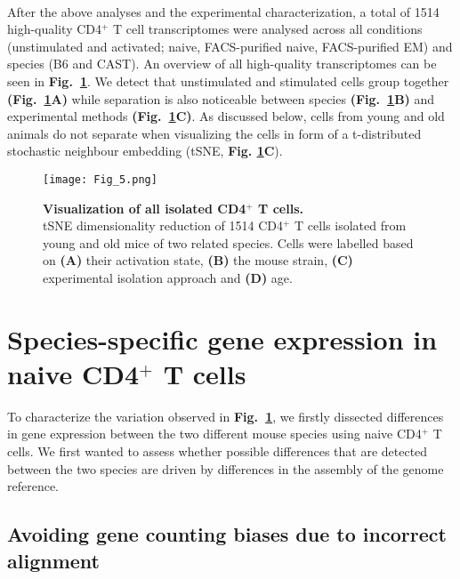 {\\}
\captionsetup[figure]{list=yes}

After the above analyses and the experimental characterization, a total of 1514 high-quality CD4$^+$ T cell transcriptomes were analysed across all conditions (unstimulated and activated; naive, FACS-purified naive, FACS-purified EM) and species (B6 and CAST). An overview of all high-quality transcriptomes can be seen in \textbf{Fig.~\ref{fig1:all_cells}}. We detect that unstimulated and stimulated cells group together \textbf{(Fig.~\ref{fig1:all_cells}A)} while separation is also noticeable between species \textbf{(Fig.~\ref{fig1:all_cells}B)} and experimental methods \textbf{(Fig.~\ref{fig1:all_cells}C)}. As discussed below, cells from young and old animals do not separate when visualizing the cells in form of a t-distributed stochastic neighbour embedding (tSNE, \textbf{Fig. \ref{fig1:all_cells}C}). 

\newpage

\begin{figure}[!hb]
\centering
\texttt{[image: Fig\_5.png]}
\caption[Visualization of all isolated CD4$^+$ T cells]{\textbf{Visualization of all isolated CD4$^+$ T cells.}\\
tSNE dimensionality reduction of 1514 CD4$^+$ T cells isolated from young and old mice of two related species. Cells were labelled based on \textbf{(A)} their activation state, \textbf{(B)} the mouse strain, \textbf{(C)} experimental isolation approach and \textbf{(D)} age.}
\label{fig1:all_cells}
\end{figure}

\newpage

\section{Species-specific gene expression in naive CD4$^+$ T cells}

To characterize the variation observed in \textbf{Fig.~\ref{fig1:all_cells}}, we firstly dissected differences in gene expression between the two different mouse species using naive CD4$^+$ T cells. We first wanted to assess whether possible differences that are detected between the two species are driven by differences in the assembly of the genome reference.

\subsection{Avoiding gene counting biases due to incorrect alignment}

